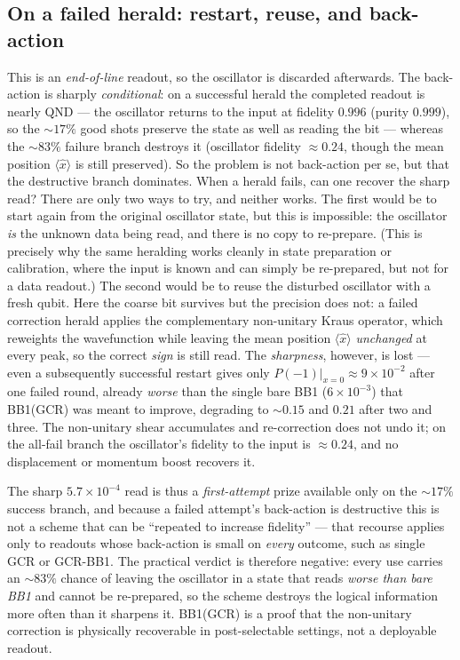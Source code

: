 \documentclass[11pt]{article}
\begin{document}
\subsection{On a failed herald: restart, reuse, and back-action}\label{sec:endofline}
This is an \emph{end-of-line} readout, so the oscillator is discarded afterwards. The back-action is
sharply \emph{conditional}: on a successful herald the completed readout is nearly QND --- the
oscillator returns to the input at fidelity $0.996$ (purity $0.999$), so the $\sim17\%$ good shots
preserve the state as well as reading the bit --- whereas the $\sim83\%$ failure branch destroys it
(oscillator fidelity $\approx0.24$, though the mean position $\langle\hat x\rangle$ is still
preserved). So the problem is not back-action per se, but that the destructive branch dominates. When
a herald fails, can one recover the sharp read? There are only two ways to try, and neither works.
The first would be to start again from the original oscillator state, but this is impossible: the
oscillator \emph{is} the unknown data being read, and there is no copy to re-prepare. (This is
precisely why the same heralding works cleanly in state preparation or calibration, where the input is
known and can simply be re-prepared, but not for a data readout.) The second would be to reuse the
disturbed oscillator with a fresh qubit. Here the coarse bit survives but the precision does not: a
failed correction herald applies the complementary non-unitary Kraus operator, which reweights the
wavefunction while leaving the mean position $\langle\hat x\rangle$ \emph{unchanged} at every peak, so
the correct \emph{sign} is still read. The \emph{sharpness}, however, is lost --- even a subsequently
successful restart gives only $P(-1)|_{x=0}\approx9\times10^{-2}$ after one failed round, already
\emph{worse} than the single bare BB1 ($6\times10^{-3}$) that BB1(GCR) was meant to improve, degrading
to $\sim0.15$ and $0.21$ after two and three. The non-unitary shear accumulates and re-correction does
not undo it; on the all-fail branch the oscillator's fidelity to the input is $\approx0.24$, and no
displacement or momentum boost recovers it.

The sharp $5.7\times10^{-4}$ read is thus a \emph{first-attempt} prize available only on the
$\sim17\%$ success branch, and because a failed attempt's back-action is destructive this is not a
scheme that can be ``repeated to increase fidelity'' --- that recourse applies only to readouts whose
back-action is small on \emph{every} outcome, such as single GCR or GCR-BB1. The practical verdict is
therefore negative: every use carries an $\sim\!83\%$ chance of leaving the oscillator in a state that
reads \emph{worse than bare BB1} and cannot be re-prepared, so the scheme destroys the logical
information more often than it sharpens it.
BB1(GCR) is a proof that the non-unitary correction is physically recoverable in post-selectable
settings, not a deployable readout.
\end{document}
